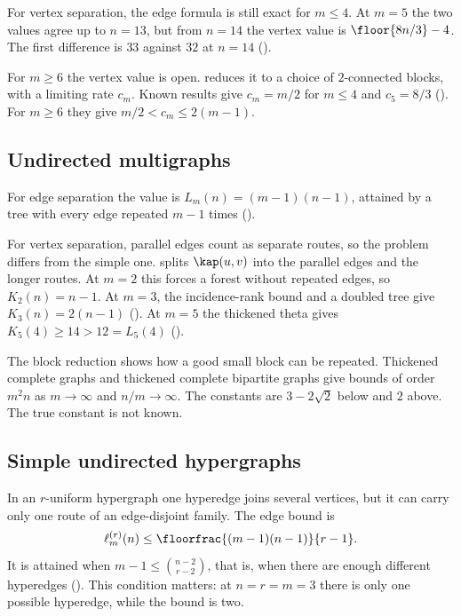 For vertex separation, the edge formula is still exact for $m\le4$.
At $m=5$ the two values agree up to $n=13$, but from $n=14$ the vertex value is $\floor{8n/3}-4$.
The first difference is $33$ against $32$ at $n=14$ ().

For $m\ge6$ the vertex value is open.
 reduces it to a choice of $2$-connected blocks, with a limiting rate $c_m$.
Known results give $c_m=m/2$ for $m\le4$ and $c_5=8/3$ ().
For $m\ge6$ they give $m/2<c_m\le2(m-1)$.

\subsection{Undirected multigraphs}
\label{sec:status-multigraph}

For edge separation the value is $L_m(n)=(m-1)(n-1)$, attained by a tree with every edge repeated $m-1$ times ().

For vertex separation, parallel edges count as separate routes, so the problem differs from the simple one.
 splits $\kap(u,v)$ into the parallel edges and the longer routes.
At $m=2$ this forces a forest without repeated edges, so $K_2(n)=n-1$.
At $m=3$, the incidence-rank bound and a doubled tree give $K_3(n)=2(n-1)$ ().
At $m=5$ the thickened theta gives $K_5(4)\ge14>12=L_5(4)$ ().

The block reduction shows how a good small block can be repeated.
Thickened complete graphs and thickened complete bipartite graphs give bounds of order $m^2n$ as $m\to\infty$ and $n/m\to\infty$.
The constants are $3-2\sqrt2$ below and $2$ above. The true constant is not known.

\subsection{Simple undirected hypergraphs}
\label{sec:status-simple-hypergraph}

In an $r$-uniform hypergraph one hyperedge joins several vertices, but it can carry only one route of an edge-disjoint family.
The edge bound is
\[
 \ell_m^{(r)}(n)\le\floorfrac{(m-1)(n-1)}{r-1}.
\]
It is attained when $m-1\le\binom{n-2}{r-2}$, that is, when there are enough different hyperedges ().
This condition matters: at $n=r=m=3$ there is only one possible hyperedge, while the bound is two.

